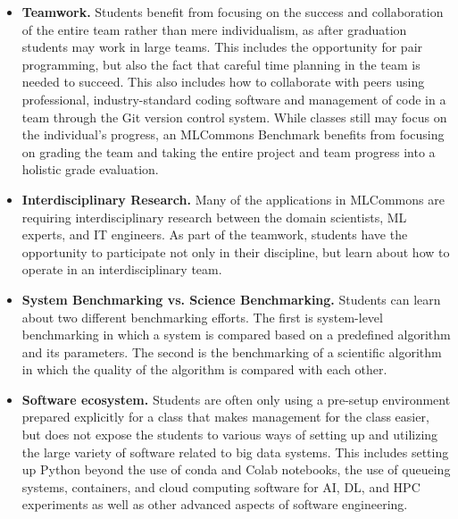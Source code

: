 \documentclass[utf8]{FrontiersinVancouver} %
\begin{document}
\begin{itemize}


\item {\bf Teamwork.} Students benefit from focusing on the success
  and collaboration of the entire team rather than mere individualism,
  as after graduation students may work in large teams. This includes
  the opportunity for pair programming, but also the fact that careful
  time planning in the team is needed to succeed. This also includes
  how to collaborate with peers using professional, industry-standard
  coding software and management of code in a team through the Git
  version control system. While classes still may focus on the
  individual's progress, an MLCommons Benchmark benefits from focusing
  on grading the team and taking the entire project and team progress
  into a holistic grade evaluation.

  \item {\bf Interdisciplinary Research.} Many of the applications in
    MLCommons are requiring interdisciplinary research between the domain
    scientists, ML experts, and IT engineers. As part of the teamwork,
    students have the opportunity to participate not only in their
    discipline, but learn about how to operate in an interdisciplinary
    team.

  \item {\bf System Benchmarking vs. Science Benchmarking.} Students
    can learn about two different benchmarking efforts. The first is
    system-level benchmarking in which a system is compared based
    on a predefined algorithm and its parameters. The second is the
    benchmarking of a scientific algorithm in which the quality of the
    algorithm is compared with each other.

  \item {\bf Software ecosystem.} Students are often only using a
    pre-setup environment prepared explicitly for a class that makes
    management for the class easier, but does not expose the students
    to various ways of setting up and utilizing the large variety of
    software related to big data systems. This includes setting up
    Python beyond the use of conda and Colab notebooks, the use of
    queueing systems, containers, and cloud computing software for
    AI, DL, and HPC experiments as well as other advanced aspects of
    software engineering.


\end{itemize}
\end{document}
